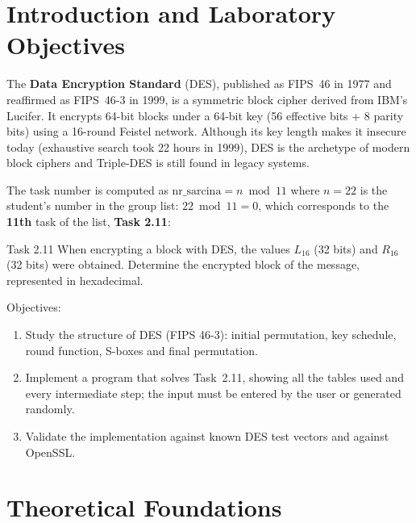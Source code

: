 \documentclass[12pt,a4paper]{article}
\begin{document}
\makereporttitle
\tableofcontents
\newpage

\section{Introduction and Laboratory Objectives}
The \textbf{Data Encryption Standard} (DES), published as FIPS~46 in 1977 and reaffirmed as
FIPS~46-3 in 1999, is a symmetric block cipher derived from IBM's Lucifer. It encrypts 64-bit
blocks under a 64-bit key (56 effective bits + 8 parity bits) using a 16-round Feistel network.
Although its key length makes it insecure today (exhaustive search took 22 hours in 1999), DES is
the archetype of modern block ciphers and Triple-DES is still found in legacy systems.

The task number is computed as $\text{nr\_sarcina} = n \bmod 11$ where $n=22$ is the student's
number in the group list: $22 \bmod 11 = 0$, which corresponds to the \textbf{11th} task of the
list, \textbf{Task 2.11}:
\begin{infobox}{Task 2.11}
When encrypting a block with DES, the values $L_{16}$ (32 bits) and $R_{16}$ (32 bits) were obtained.
Determine the encrypted block of the message, represented in hexadecimal.
\end{infobox}

Objectives:
\begin{enumerate}
  \item Study the structure of DES (FIPS 46-3): initial permutation, key schedule, round function,
        S-boxes and final permutation.
  \item Implement a program that solves Task~2.11, showing all the tables used and every
        intermediate step; the input must be entered by the user or generated randomly.
  \item Validate the implementation against known DES test vectors and against OpenSSL.
\end{enumerate}

\section{Theoretical Foundations}
\end{document}
